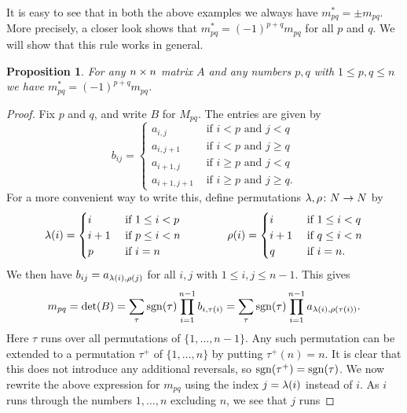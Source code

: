 \documentclass[reqno]{amsart}
\newtheorem{proposition}[theorem]{Proposition}
\theoremstyle{definition}
\begin{document}
It is easy to see that in both the above examples we always have
$m^*_{pq}=\pm m_{pq}$.  More precisely, a closer look shows that
$m^*_{pq}=(-1)^{p+q}m_{pq}$ for all $p$ and $q$.  We will show that
this rule works in general.

\begin{proposition}\label{prop-minors}
 For any $n\times n$ matrix $A$ and any numbers $p,q$ with
 $1\leq p,q\leq n$ we have $m^*_{pq}=(-1)^{p+q}m_{pq}$.
\end{proposition}
\begin{proof}
 Fix $p$ and $q$, and write $B$ for $M_{pq}$.  The entries are given
 by
 \[ b_{ij} =
     \begin{cases}
      a_{i,j}     & \text{ if } i<p \text{ and } j < q \\
      a_{i,j+1}   & \text{ if } i<p \text{ and } j \geq q \\
      a_{i+1,j}   & \text{ if } i\geq p \text{ and } j < q \\
      a_{i+1,j+1} & \text{ if } i\geq p \text{ and } j \geq q.
     \end{cases}
 \]
 For a more convenient way to write this, define permutations
 $\lambda,\rho\colon N\to N$ by
 \[ \lambda(i) = \begin{cases}
      i   & \text{ if } 1\leq i<p \\
      i+1 & \text{ if } p\leq i<n \\
      p   & \text{ if } i=n
     \end{cases}
     \hspace{4em}
    \rho(i) = \begin{cases}
      i   & \text{ if } 1\leq i<q \\
      i+1 & \text{ if } q\leq i<n \\
      q   & \text{ if } i=n.
     \end{cases}
 \]
 We then have $b_{ij}=a_{\lambda(i),\rho(j)}$ for all $i,j$ with
 $1\leq i,j\leq n-1$.  This gives
 \[ m_{pq} = \det(B)
     = \sum_\tau \operatorname{sgn}(\tau)\prod_{i=1}^{n-1}b_{i,\tau(i)}
     = \sum_\tau \operatorname{sgn}(\tau)\prod_{i=1}^{n-1}a_{\lambda(i),\rho(\tau(i))}.
 \]
 Here $\tau$ runs over all permutations of $\{1,\dotsc,n-1\}$.  Any
 such permutation can be extended to a permutation $\tau^+$ of
 $\{1,\dotsc,n\}$ by putting $\tau^+(n)=n$.  It is clear that this
 does not introduce any additional reversals, so
 $\operatorname{sgn}(\tau^+)=\operatorname{sgn}(\tau)$.  We now rewrite the above expression for
 $m_{pq}$ using the index $j=\lambda(i)$ instead of $i$.  As $i$ runs
 through the numbers $1,\dotsc,n$ excluding $n$, we see that $j$ runs

\end{proof}
\end{document}
